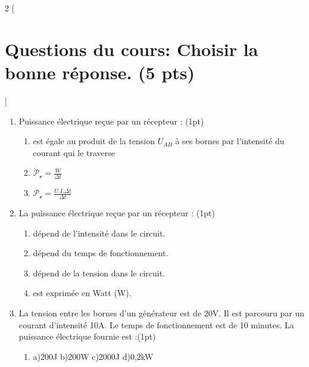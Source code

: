 \documentclass[12pt]{article}
\begin{document}
\begin{multicols}{2}
    [
        \section*{Questions du cours: Choisir la bonne réponse. (5 pts)}
    ]

\begin{enumerate}
  \item Puissance électrique reçue par un récepteur :  \dotfill(1pt)
      \begin{enumerate}
          \item est égale au produit de la
            tension $U_{AB}$ à ses bornes par l’intensité du courant qui le traverse
          \item $\mathscr{P_e} = \frac{W}{\Delta{t}}$
          \item $\mathscr{P_e} = \frac{U.I.\Delta{t}}{\Delta{t}}$
      \end{enumerate}


    \item La puissance électrique reçue par un récepteur : \dotfill(1pt)
      \begin{enumerate}
          \item dépend de l’intensité dans le circuit.
          \item dépend du temps de fonctionnement.
          \item dépend de la tension dans le circuit.
          \item est exprimée en Watt (W).
      \end{enumerate}
        \vspace{1cm}
      \item La tension entre les bornes d’un générateur est de 20V. Il est parcouru par un courant d’intensité 10A. Le temps de fonctionnement est de 10 minutes. La puissance électrique fournie est :\dotfill(1pt) 
      \begin{enumerate}
          \vspace{-0.6cm}
        \item[] a)200J \hspace{0.25cm} b)200W \hspace{0.25cm} c)2000J \hspace{0.25cm} d)0,2kW
      \end{enumerate}


\end{enumerate}
\end{multicols}
\end{document}
